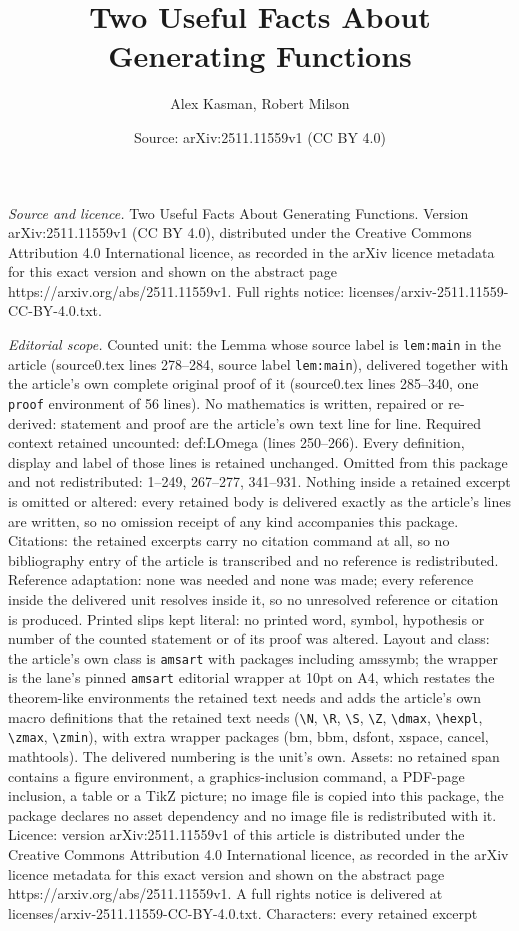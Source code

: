 \documentclass[10pt,a4paper]{amsart}
\title[Two Useful Facts About Generating Functions]{Two Useful Facts About Generating Functions}
\author{Alex Kasman, Robert Milson}
\date{Source: arXiv:2511.11559v1 (CC BY 4.0)}
\begin{document}
\maketitle

\noindent\emph{Source and licence.} Two Useful Facts About Generating Functions. Version arXiv:2511.11559v1 (CC BY 4.0), distributed under the Creative Commons Attribution 4.0 International licence, as recorded in the arXiv licence metadata for this exact version and shown on the abstract page https://arxiv.org/abs/2511.11559v1. Full rights notice: licenses/arxiv-2511.11559-CC-BY-4.0.txt.\par\smallskip

\noindent\textit{Editorial scope.} Counted unit: the Lemma whose source label is \texttt{lem:main} in the article (source0.tex lines 278--284, source label \texttt{lem:main}), delivered together with the article's own complete original proof of it (source0.tex lines 285--340, one \texttt{proof} environment of 56 lines). No mathematics is written, repaired or re-derived: statement and proof are the article's own text line for line. Required context retained uncounted: def:LOmega (lines 250--266). Every definition, display and label of those lines is retained unchanged. Omitted from this package and not redistributed: 1--249, 267--277, 341--931. Nothing inside a retained excerpt is omitted or altered: every retained body is delivered exactly as the article's lines are written, so no omission receipt of any kind accompanies this package. Citations: the retained excerpts carry no citation command at all, so no bibliography entry of the article is transcribed and no reference is redistributed. Reference adaptation: none was needed and none was made; every reference inside the delivered unit resolves inside it, so no unresolved reference or citation is produced. Printed slips kept literal: no printed word, symbol, hypothesis or number of the counted statement or of its proof was altered. Layout and class: the article's own class is \texttt{amsart} with packages including amssymb; the wrapper is the lane's pinned \texttt{amsart} editorial wrapper at 10pt on A4, which restates the theorem-like environments the retained text needs and adds the article's own macro definitions that the retained text needs (\texttt{\textbackslash N}, \texttt{\textbackslash R}, \texttt{\textbackslash S}, \texttt{\textbackslash Z}, \texttt{\textbackslash dmax}, \texttt{\textbackslash hexpl}, \texttt{\textbackslash zmax}, \texttt{\textbackslash zmin}), with extra wrapper packages (bm, bbm, dsfont, xspace, cancel, mathtools). The delivered numbering is the unit's own. Assets: no retained span contains a figure environment, a graphics-inclusion command, a PDF-page inclusion, a table or a TikZ picture; no image file is copied into this package, the package declares no asset dependency and no image file is redistributed with it. Licence: version arXiv:2511.11559v1 of this article is distributed under the Creative Commons Attribution 4.0 International licence, as recorded in the arXiv licence metadata for this exact version and shown on the abstract page https://arxiv.org/abs/2511.11559v1. A full rights notice is delivered at licenses/arxiv-2511.11559-CC-BY-4.0.txt. Characters: every retained excerpt 
\end{document}
